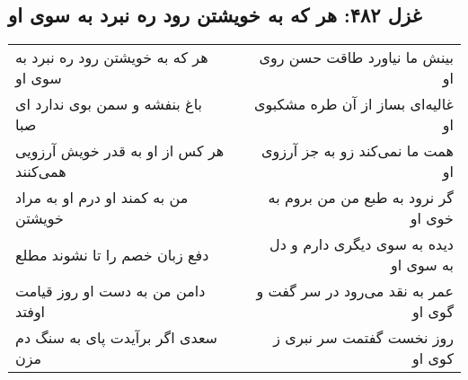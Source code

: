 \begin{center}
\section*{غزل ۴۸۲: هر که به خویشتن رود ره نبرد به سوی او}
\label{sec:482}
\begin{longtable}{l p{0.5cm} r}
هر که به خویشتن رود ره نبرد به سوی او
&&
بینش ما نیاورد طاقت حسن روی او
\\
باغ بنفشه و سمن بوی ندارد ای صبا
&&
غالیه‌ای بساز از آن طره مشکبوی او
\\
هر کس از او به قدر خویش آرزویی همی‌کنند
&&
همت ما نمی‌کند زو به جز آرزوی او
\\
من به کمند او درم او به مراد خویشتن
&&
گر نرود به طبع من من بروم به خوی او
\\
دفع زبان خصم را تا نشوند مطلع
&&
دیده به سوی دیگری دارم و دل به سوی او
\\
دامن من به دست او روز قیامت اوفتد
&&
عمر به نقد می‌رود در سر گفت و گوی او
\\
سعدی اگر برآیدت پای به سنگ دم مزن
&&
روز نخست گفتمت سر نبری ز کوی او
\\
\end{longtable}
\end{center}
